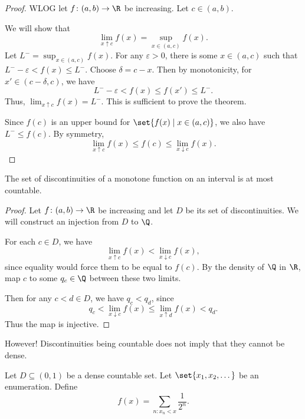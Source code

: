 \begin{proof}
    WLOG let $f\colon (a, b) \to \R$ be increasing.
    Let $c \in (a, b)$.

    We will show that \[
        \lim_{x \uparrow c} f(x) = \sup_{x \in (a, c)} f(x).
    \] Let $L^- = \sup_{x \in (a, c)} f(x)$.
    For any $\varepsilon > 0$, there is some $x \in (a, c)$ such that
    $L^- - \varepsilon < f(x) \leq L^-$.
    Choose $\delta = c - x$.
    Then by monotonicity, for $x' \in (c - \delta, c)$, we have \[
        L^- - \varepsilon < f(x) \le f(x') \le L^-.
    \] Thus, $\lim_{x \uparrow c} f(x) = L^-$.
    This is sufficient to prove the theorem.

    Since $f(c)$ is an upper bound for $\set{f(x) \mid x \in (a, c)}$,
    we also have $L^- \le f(c)$.
    By symmetry, \[
        \lim_{x \uparrow c} f(x) \le f(c) \le \lim_{x \downarrow c} f(x).
    \]
\end{proof}

\begin{corollary}
    The set of discontinuities of a monotone function on an interval is
    at most countable.
\end{corollary}
\begin{proof}
    Let $f\colon (a, b) \to \R$ be increasing and let $D$ be its set of
    discontinuities.
    We will construct an injection from $D$ to $\Q$.

    For each $c \in D$, we have \[
        \lim_{x \uparrow c} f(x) < \lim_{x \downarrow c} f(x),
    \] since equality would force them to be equal to $f(c)$.
    By the density of $\Q$ in $\R$, map $c$ to some $q_c \in \Q$ between
    these two limits.

    Then for any $c < d \in D$, we have $q_c < q_d$, since \[
        q_c < \lim_{x \downarrow c} f(x) \le \lim_{x \uparrow d} f(x) < q_d.
    \] Thus the map is injective.
\end{proof}

However! Discontinuities being countable does not imply that they cannot
be dense.
\begin{example}
    Let $D \subseteq (0, 1)$ be a dense countable set.
    Let $\set{x_1, x_2, \dots}$ be an enumeration.
    Define \[
        f(x) = \sum_{n : x_n < x} \frac1{2^n}.
    \]
\end{example}
